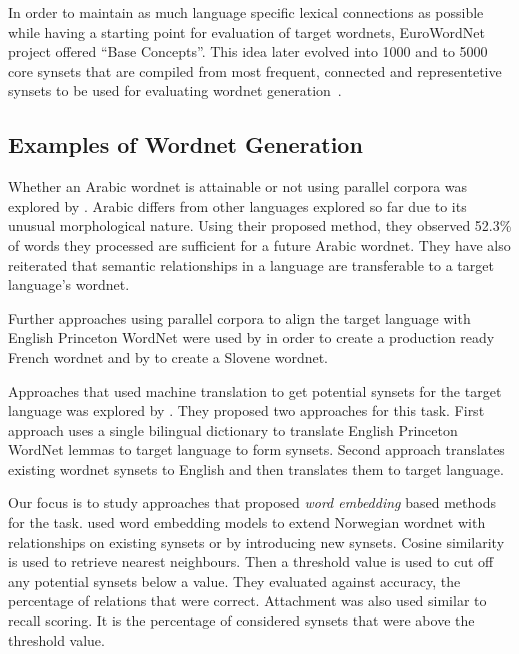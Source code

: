In order to maintain as much language specific lexical connections as possible while having a starting point for evaluation of target wordnets, EuroWordNet project offered \enquote{Base Concepts}.
This idea later evolved into 1000 and to 5000 core synsets that are compiled from most frequent, connected and representetive synsets to be used for evaluating wordnet generation~\cite{boyd-graber_adding_2006}.

\subsection{Examples of Wordnet Generation}%
\label{sub:examples_of_wordnet_generation}

Whether an Arabic wordnet is attainable or not using parallel corpora was explored by \textcite{diab_feasibility_2004}.
Arabic differs from other languages explored so far due to its unusual morphological nature.
Using their proposed method, they observed 52.3\% of words they processed are sufficient for a future Arabic wordnet.
They have also reiterated that semantic relationships in a language are transferable to a target language's wordnet.

Further approaches using parallel corpora to align the target language with English Princeton WordNet were used by \textcite{sagot_building_2008} in order to create a production ready French wordnet and by \textcite{fiser_leveraging_2009} to create a Slovene wordnet.

Approaches that used machine translation to get potential synsets for the target language was explored by \textcite{lam_automatically_2014}.
They proposed two approaches for this task.
First approach uses a single bilingual dictionary to translate English Princeton WordNet lemmas to target language to form synsets.
Second approach translates existing wordnet synsets to English and then translates them to target language.

Our focus is to study approaches that proposed \emph{word embedding} based methods for the task.
\textcite{sand_wordnet_2017} used word embedding models to extend Norwegian wordnet with relationships on existing synsets or by introducing new synsets.
Cosine similarity is used to retrieve nearest neighbours.
Then a threshold value is used to cut off any potential synsets below a value.
They evaluated against accuracy, the percentage of relations that were correct.
Attachment was also used similar to recall scoring.
It is the percentage of considered synsets that were above the threshold value.

